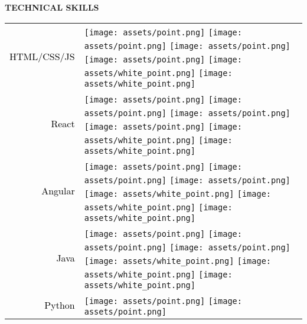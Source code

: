 \documentclass[../main.tex]{subfiles}
\begin{document}
\vspace*{0.5cm}

\textbf{\textcolor{myCV2}{TECHNICAL SKILLS\underline{\hspace{4.2cm}}}}
\vspace*{0.3cm}

    \begin{tabular}{r l}
    \textcolor{black}{\vspace*{0.2cm}HTML/CSS/JS} &            
            \texttt{[image: assets/point.png]}
            \texttt{[image: assets/point.png]}
            \texttt{[image: assets/point.png]}
            \texttt{[image: assets/point.png]}
            \texttt{[image: assets/white\_point.png]}
            \texttt{[image: assets/white\_point.png]}\\
    \textcolor{black}{\vspace*{0.2cm}React} &
            \texttt{[image: assets/point.png]}
            \texttt{[image: assets/point.png]}
            \texttt{[image: assets/point.png]}
            \texttt{[image: assets/point.png]}
            \texttt{[image: assets/white\_point.png]}
            \texttt{[image: assets/white\_point.png]}\\
    \textcolor{black}{\vspace*{0.2cm}Angular} &
            \texttt{[image: assets/point.png]}
            \texttt{[image: assets/point.png]}
            \texttt{[image: assets/point.png]}
            \texttt{[image: assets/white\_point.png]}
            \texttt{[image: assets/white\_point.png]}
            \texttt{[image: assets/white\_point.png]}\\
    \textcolor{black}{\vspace*{0.2cm}Java} &
            \texttt{[image: assets/point.png]}
            \texttt{[image: assets/point.png]}
            \texttt{[image: assets/point.png]}
            \texttt{[image: assets/white\_point.png]}
            \texttt{[image: assets/white\_point.png]}
            \texttt{[image: assets/white\_point.png]}\\
    \textcolor{black}{\vspace*{0.2cm}Python} &
            \texttt{[image: assets/point.png]}
            \texttt{[image: assets/point.png]}

\end{tabular}
\end{document}
